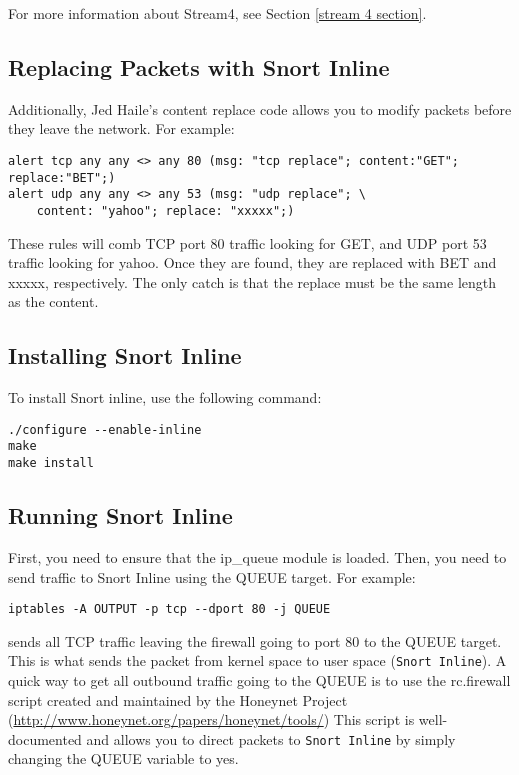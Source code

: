 \documentclass[english]{report}
\begin{document}
For more information about Stream4, see Section \ref{stream 4 section}.

\subsection{Replacing Packets with Snort Inline\label{ReplaceInline}}

Additionally, Jed Haile's content replace code allows you to modify packets
before they leave the network.  For example:

\begin{verbatim}
alert tcp any any <> any 80 (msg: "tcp replace"; content:"GET"; replace:"BET";)
alert udp any any <> any 53 (msg: "udp replace"; \
    content: "yahoo"; replace: "xxxxx";)
\end{verbatim}

These rules will comb TCP port 80 traffic looking for GET, and UDP port 53
traffic looking for yahoo.  Once they are found, they are replaced with BET and
xxxxx, respectively.  The only catch is that the replace must be the same
length as the content.


\subsection{Installing Snort Inline\label{InlineInstall}}
To install Snort inline, use the following command:
\begin{verbatim}
./configure --enable-inline
make
make install
\end{verbatim} 


\subsection{Running Snort Inline}

First, you need to ensure that the ip\_queue module is loaded.  Then,
you need to send traffic to Snort Inline using the QUEUE target.  For
example:
\begin{verbatim}
iptables -A OUTPUT -p tcp --dport 80 -j QUEUE
\end{verbatim}
sends all TCP traffic leaving the firewall going to port 80 to the QUEUE
target.  This is what sends the packet from kernel space to user space 
(\texttt{Snort Inline}).  A quick way to get all outbound traffic going to the
QUEUE is to use the rc.firewall script created and maintained by the 
Honeynet Project (\url{http://www.honeynet.org/papers/honeynet/tools/})
This script is well-documented and allows you to direct packets
to \texttt{Snort Inline} by simply changing the QUEUE variable to yes.
\end{document}
